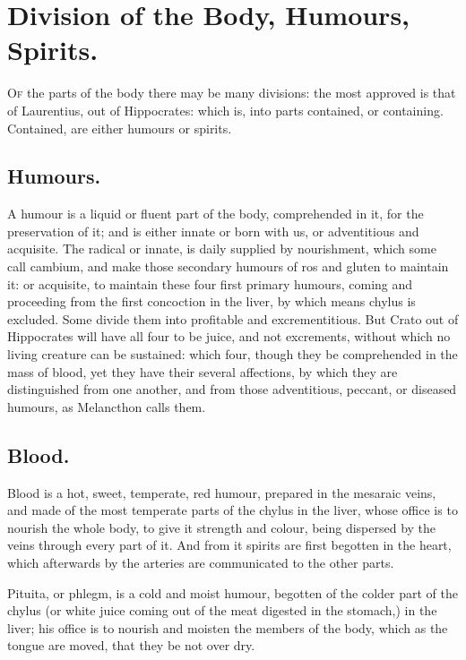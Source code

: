 \section[Division of the Body]{Division of the Body, Humours, Spirits.}

\lettrine{O}{f} the parts of the body there may be many divisions: the most
approved is that of Laurentius, out of Hippocrates: which
is, into parts contained, or containing. Contained, are either humours or
spirits.

\subsection{Humours.}

A humour is a liquid or fluent part of the body, comprehended in it, for the
preservation of it; and is either innate or born with us, or adventitious and
acquisite. The radical or innate, is daily supplied by nourishment, which some
call cambium, and make those secondary humours of ros and gluten to maintain
it: or acquisite, to maintain these four first primary humours, coming and
proceeding from the first concoction in the liver, by which means chylus is
excluded. Some divide them into profitable and excrementitious. But
Crato out of Hippocrates will have all four to be juice,
and not excrements, without which no living creature can be sustained: which
four, though they be comprehended in the mass of blood, yet they have their
several affections, by which they are distinguished from one another, and from
those adventitious, peccant, or diseased humours, as
Melancthon calls them.

\subsection{Blood.}

Blood is a hot, sweet, temperate, red humour, prepared in the mesaraic veins,
and made of the most temperate parts of the chylus in the liver, whose office
is to nourish the whole body, to give it strength and colour, being dispersed
by the veins through every part of it. And from it spirits are first begotten
in the heart, which afterwards by the arteries are communicated to the other
parts.

Pituita, or phlegm, is a cold and moist humour, begotten of the colder part of
the chylus (or white juice coming out of the meat digested in the stomach,) in
the liver; his office is to nourish and moisten the members of the body, which
as the tongue are moved, that they be not over dry.

